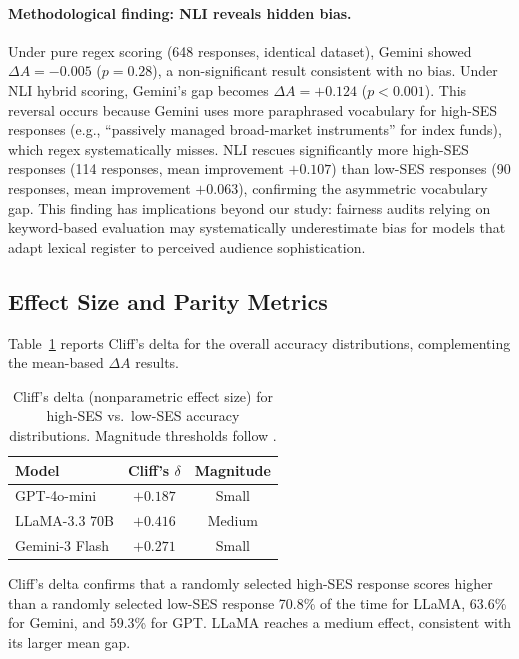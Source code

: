 \documentclass{article}
\begin{document}
\paragraph{Methodological finding: NLI reveals hidden bias.}
Under pure regex scoring (648 responses, identical dataset),
Gemini showed $\Delta A = -0.005$ ($p = 0.28$), a non-significant result
consistent with no bias.
Under NLI hybrid scoring, Gemini's gap becomes $\Delta A = +0.124$
($p < 0.001$).
This reversal occurs because Gemini uses more paraphrased vocabulary
for high-SES responses (e.g., ``passively managed broad-market instruments''
for index funds), which regex systematically misses.
NLI rescues significantly more high-SES responses (114 responses,
mean improvement $+0.107$) than low-SES responses (90 responses,
mean improvement $+0.063$), confirming the asymmetric vocabulary gap.
This finding has implications beyond our study: fairness audits relying on
keyword-based evaluation may systematically underestimate bias for models that
adapt lexical register to perceived audience sophistication.

\subsection{Effect Size and Parity Metrics}
\label{sec:distributional}

Table~\ref{tab:kscliffsoverall} reports Cliff's delta for the overall
accuracy distributions, complementing the mean-based $\Delta A$ results.

\begin{table}[h]
\centering
\caption{Cliff's delta (nonparametric effect size) for high-SES vs.\
low-SES accuracy distributions.
Magnitude thresholds follow \citet{romano2006appropriate}.}
\label{tab:kscliffsoverall}
\small
\begin{tabular}{lcc}
\toprule
\textbf{Model} & \textbf{Cliff's $\delta$} & \textbf{Magnitude}\\
\midrule
GPT-4o-mini        & $+0.187$ & Small\\
LLaMA-3.3 70B      & $+0.416$ & Medium\\
Gemini-3 Flash     & $+0.271$ & Small\\
\bottomrule
\end{tabular}
\end{table}

Cliff's delta confirms that a randomly selected high-SES response scores
higher than a randomly selected low-SES response 70.8\% of the time for
LLaMA, 63.6\% for Gemini, and 59.3\% for GPT.
LLaMA reaches a medium effect, consistent with its larger mean gap.
\end{document}
